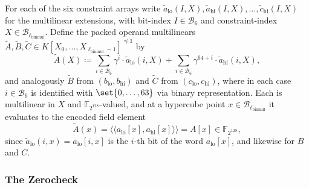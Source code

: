 \documentclass{article}
\theoremstyle{definition}
\newcommand*{\mlin}{{\preceq 1}}
\newcommand*{\mle}{\widetilde}
\newcommand{\BB}{\mathcal{B}}
\newcommand{\FF}[1]{\mathbb{F}_{#1}}
\newcommand{\gval}[1]{\langle\!\langle #1 \rangle\!\rangle}
\begin{document}
For each of the six constraint arrays write $\mle{a}_\text{lo}(I, X), \mle{a}_\text{hi}(I, X), \ldots, \mle{c}_\text{hi}(I, X)$ for the multilinear extensions, with bit-index $I \in \BB_6$ and constraint-index $X \in \BB_{\ell_\text{binmul}}$. Define the packed operand multilinears $\mle{A}, \mle{B}, \mle{C} \in K[X_0, \ldots, X_{\ell_\text{binmul} - 1}]^\mlin$ by
\[
  \mle{A}(X) \coloneqq \sum_{i \in \BB_6} \gamma^i \cdot \mle{a}_\text{lo}(i, X) + \sum_{i \in \BB_6} \gamma^{64 + i} \cdot \mle{a}_\text{hi}(i, X),
\]
and analogously $\mle{B}$ from $(b_\text{lo}, b_\text{hi})$ and $\mle{C}$ from $(c_\text{lo}, c_\text{hi})$, where in each case $i \in \BB_6$ is identified with $\set{0, \ldots, 63}$ via binary representation. Each is multilinear in $X$ and $\FF{2^{128}}$-valued, and at a hypercube point $x \in \BB_{\ell_\text{binmul}}$ it evaluates to the encoded field element
\[
  \mle{A}(x) = \gval{a_\text{lo}[x], a_\text{hi}[x]} = A[x] \in \FF{2^{128}},
\]
since $\mle{a}_\text{lo}(i, x) = a_\text{lo}[i, x]$ is the $i$-th bit of the word $a_\text{lo}[x]$, and likewise for $B$ and $C$.

\subsubsection{The Zerocheck}
\label{sec:binmul-zerocheck}
\end{document}
